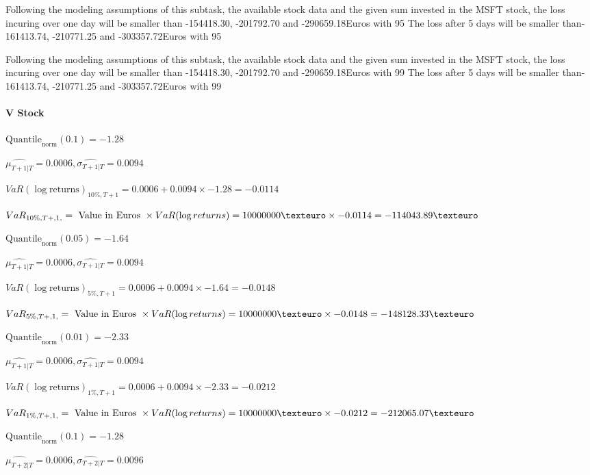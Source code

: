 Following the modeling assumptions of this subtask, the available stock data and the given sum invested in the MSFT stock, the loss incuring over one day will be smaller than -154418.30, -201792.70 and -290659.18Euros with 95%
The loss after 5 days will be smaller than-161413.74, -210771.25 and -303357.72Euros with 95%
 

Following the modeling assumptions of this subtask, the available stock data and the given sum invested in the MSFT stock, the loss incuring over one day will be smaller than -154418.30, -201792.70 and -290659.18Euros with 99%
The loss after 5 days will be smaller than-161413.74, -210771.25 and -303357.72Euros with 99%

\paragraph{V Stock}


$\text{Quantile}_\text{norm}(0.1) = -1.28$

$\hat{\mu_{T+1|T}} = 0.0006, \hat{\sigma_{T+1|T}} = 0.0094$

$VaR(\log \text{returns})_{10\%, T + 1} = 0.0006 + 0.0094\times-1.28 = -0.0114$

$VaR_{10\%, T + ,1,} = \text{ Value in Euros } \times VaR(\log returns) = 10 000 000 \texteuro \times-0.0114 = -114043.89 \texteuro$


$\text{Quantile}_\text{norm}(0.05) = -1.64$

$\hat{\mu_{T+1|T}} = 0.0006, \hat{\sigma_{T+1|T}} = 0.0094$

$VaR(\log \text{returns})_{5\%, T + 1} = 0.0006 + 0.0094\times-1.64 = -0.0148$

$VaR_{5\%, T + ,1,} = \text{ Value in Euros } \times VaR(\log returns) = 10 000 000 \texteuro \times-0.0148 = -148128.33 \texteuro$


$\text{Quantile}_\text{norm}(0.01) = -2.33$

$\hat{\mu_{T+1|T}} = 0.0006, \hat{\sigma_{T+1|T}} = 0.0094$

$VaR(\log \text{returns})_{1\%, T + 1} = 0.0006 + 0.0094\times-2.33 = -0.0212$

$VaR_{1\%, T + ,1,} = \text{ Value in Euros } \times VaR(\log returns) = 10 000 000 \texteuro \times-0.0212 = -212065.07 \texteuro$


$\text{Quantile}_\text{norm}(0.1) = -1.28$

$\hat{\mu_{T+2|T}} = 0.0006, \hat{\sigma_{T+2|T}} = 0.0096$


